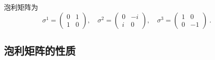 
泡利矩阵为
\begin{equation}
\sigma^1 = \begin{pmatrix}
0 & 1\\
1 & 0
\end{pmatrix},\quad 
\sigma^2 = \begin{pmatrix}
0 & -i\\
i & 0
\end{pmatrix},\quad 
\sigma^3 = 
\begin{pmatrix}
1 & 0\\
0 & -1
\end{pmatrix}
~.
\end{equation}
\subsection{泡利矩阵的性质}
